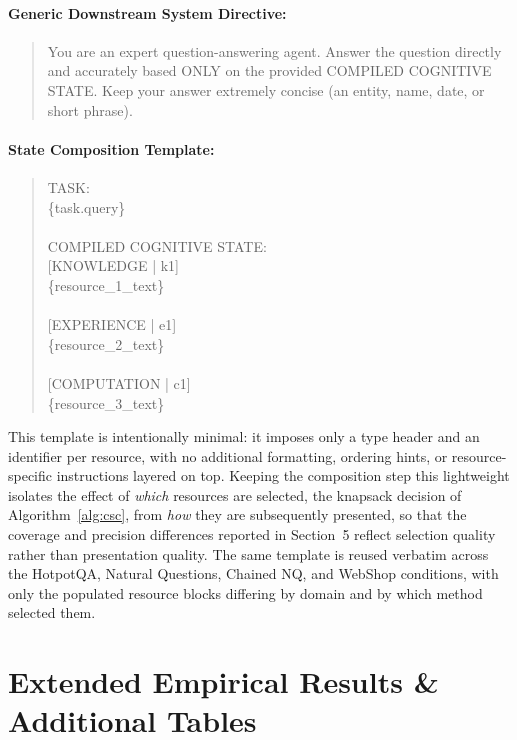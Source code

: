 \documentclass{article}
\begin{document}
\paragraph{Generic Downstream System Directive:}
\begin{quote}
\small\ttfamily
You are an expert question-answering agent. Answer the question directly and accurately based ONLY on the provided COMPILED COGNITIVE STATE. Keep your answer extremely concise (an entity, name, date, or short phrase).
\end{quote}

\paragraph{State Composition Template:}
\begin{quote}
\small\ttfamily
TASK:\\
\{task.query\}\\
\\
COMPILED COGNITIVE STATE:\\
\mbox{}[KNOWLEDGE | k1]\\
\{resource\_1\_text\}\\
\\
\mbox{}[EXPERIENCE | e1]\\
\{resource\_2\_text\}\\
\\
\mbox{}[COMPUTATION | c1]\\
\{resource\_3\_text\}
\end{quote}

This template is intentionally minimal: it imposes only a type header and an identifier per resource, with no additional formatting, ordering hints, or resource-specific instructions layered on top. Keeping the composition step this lightweight isolates the effect of \emph{which} resources are selected, the knapsack decision of Algorithm~\ref{alg:csc}, from \emph{how} they are subsequently presented, so that the coverage and precision differences reported in Section~5 reflect selection quality rather than presentation quality. The same template is reused verbatim across the HotpotQA, Natural Questions, Chained NQ, and WebShop conditions, with only the populated resource blocks differing by domain and by which method selected them.

\section{Extended Empirical Results \& Additional Tables}
\end{document}
